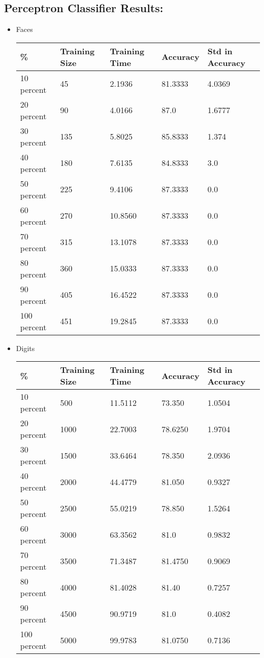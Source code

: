 \documentclass[11]{article}
\begin{document}
\subsection*{Perceptron Classifier Results:}
\begin{itemize}
\item Faces
	\begin{center}
    		\begin{tabular}{ | l | l | l | l | p{5cm} |}
    		\hline
    		 \% & Training Size & Training Time & Accuracy & Std in Accuracy \\ \hline
    		10 percent & 45 & 2.1936 & 81.3333 & 4.0369 \\ \hline
    		20 percent & 90 & 4.0166 & 87.0 & 1.6777 \\ \hline
    		30 percent & 135 & 5.8025 & 85.8333 & 1.374 \\ \hline
    		40 percent & 180 & 7.6135 & 84.8333 & 3.0 \\ \hline
    		50 percent & 225 & 9.4106 & 87.3333 & 0.0 \\ \hline
    		60 percent & 270 & 10.8560 & 87.3333 & 0.0 \\ \hline
    		70 percent & 315 & 13.1078 & 87.3333 & 0.0  \\ \hline
    		80 percent & 360 & 15.0333 & 87.3333 & 0.0  \\ \hline
    		90 percent & 405 & 16.4522 & 87.3333 & 0.0  \\ \hline
    		100 percent & 451 & 19.2845 & 87.3333 & 0.0  \\
    		\hline
    		\end{tabular}
	\end{center}
	
\item Digits
	\begin{center}
    		\begin{tabular}{ | l | l | l | l | p{5cm} |}
    		\hline
    		 \% & Training Size & Training Time & Accuracy & Std in Accuracy \\ \hline
    		10 percent & 500 & 11.5112 & 73.350 & 1.0504 \\ \hline
    		20 percent & 1000 & 22.7003 & 78.6250 & 1.9704 \\ \hline
    		30 percent & 1500 & 33.6464 & 78.350 & 2.0936 \\ \hline
    		40 percent & 2000 & 44.4779 & 81.050 & 0.9327 \\ \hline
    		50 percent & 2500 & 55.0219 & 78.850 & 1.5264 \\ \hline
    		60 percent & 3000 & 63.3562 & 81.0 & 0.9832 \\ \hline
    		70 percent & 3500 & 71.3487 & 81.4750 & 0.9069 \\ \hline
    		80 percent & 4000 & 81.4028 & 81.40 & 0.7257 \\ \hline
    		90 percent & 4500 & 90.9719 & 81.0 & 0.4082 \\ \hline
    		100 percent & 5000 & 99.9783 & 81.0750 & 0.7136 \\
    		\hline
    		\end{tabular}
	\end{center}
\end{itemize}
\end{document}
